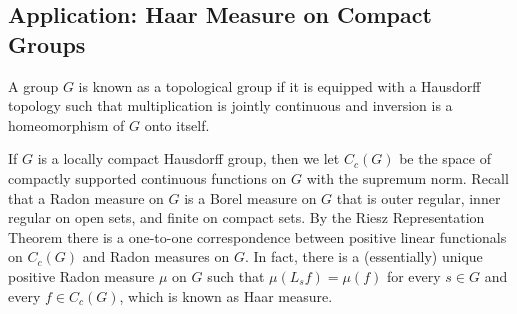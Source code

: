 \documentclass[10pt]{mypackage}
\begin{document}
\subsection{Application: Haar Measure on Compact Groups}%
\begin{definition}
  A group $G$ is known as a topological group if it is equipped with a Hausdorff topology such that multiplication is jointly continuous and inversion is a homeomorphism of $G$ onto itself.
\end{definition}
If $G$ is a locally compact Hausdorff group, then we let $C_c(G)$ be the space of compactly supported continuous functions on $G$ with the supremum norm. Recall that a Radon measure on $G$ is a Borel measure on $G$ that is outer regular, inner regular on open sets, and finite on compact sets. By the Riesz Representation Theorem there is a one-to-one correspondence between positive linear functionals on $C_c(G)$ and Radon measures on $G$. In fact, there is a (essentially) unique positive Radon measure $\mu$ on $G$ such that $\mu\left( L_sf \right) = \mu(f)$ for every $s\in G$ and every $f\in C_c(G)$, which is known as Haar measure.
\end{document}
